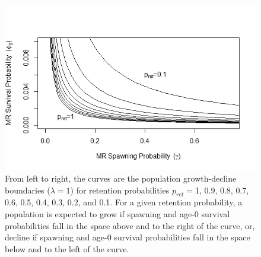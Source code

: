 \documentclass[12pt]{article}
\begin{document}
\begin{figure}[h]
\centering
\includegraphics[width=6in]{NEPA_fig_7-growth-decline-space}
\caption{From left to right, the curves are the population growth-decline boundaries ($\lambda=1$) for retention probabilities $p_{ret}=$1, 0.9, 0.8, 0.7, 0.6, 0.5, 0.4, 0.3, 0.2, and 0.1.  For a given retention probability, a population is expected to grow if spawning and age-0 survival probabilities fall in the space above and to the right of the curve, or, decline if spawning and age-0 survival probabilities fall in the space below and to the left of the curve. }
\label{phi0-gamma-pret-space}
\end{figure}
\end{document}
